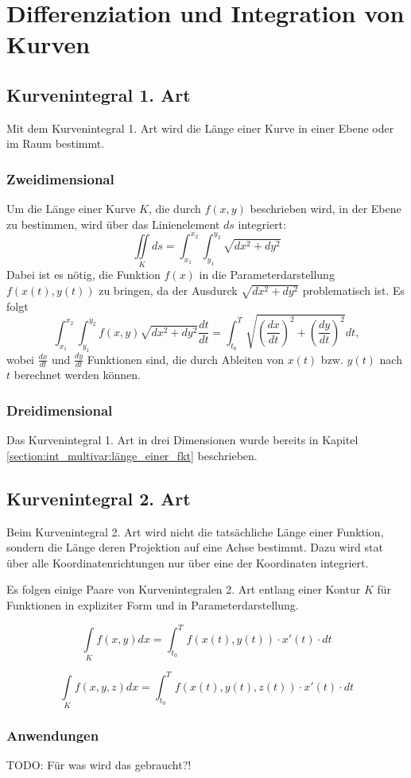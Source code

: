 \section{Differenziation und Integration von Kurven}
\subsection{Kurvenintegral 1. Art}
Mit dem Kurvenintegral 1. Art wird die Länge einer Kurve in einer Ebene oder im Raum bestimmt.

\subsubsection{Zweidimensional}
Um die Länge einer Kurve $K$, die durch $f(x, y)$ beschrieben wird, in der Ebene zu bestimmen, wird über das Linienelement $ds$ integriert:
\[
    \iint\limits_{K} ds = \int_{x_1}^{x_2} \int_{y_1}^{y_2} \sqrt{dx^2 + dy^2}
\]
Dabei ist es nötig, die Funktion $f(x)$ in die Parameterdarstellung $f(x(t), y(t))$ zu bringen, da der Ausdurck $\sqrt{dx^2 + dy^2}$ problematisch ist.
Es folgt
\[
    \int_{x_1}^{x_2} \int_{y_1}^{y_2} f(x, y) \sqrt{dx^2 + dy^2} \frac{dt}{dt} = \int_{t_0}^{T} \sqrt{(\frac{dx}{dt})^2 + (\frac{dy}{dt})^2} dt,
\]
wobei $\frac{dx}{dt}$ und $\frac{dy}{dt}$ Funktionen sind, die durch Ableiten von $x(t)$ bzw. $y(t)$ nach $t$ berechnet werden können.

\subsubsection{Dreidimensional}
Das Kurvenintegral 1. Art in drei Dimensionen wurde bereits in Kapitel \ref{section:int_multivar:länge_einer_fkt} beschrieben.

\subsection{Kurvenintegral 2. Art}
Beim Kurvenintegral 2. Art wird nicht die tatsächliche Länge einer Funktion, sondern die Länge deren Projektion auf eine Achse bestimmt.
Dazu wird stat über alle Koordinatenrichtungen nur über eine der Koordinaten integriert.

Es folgen einige Paare von Kurvenintegralen 2. Art entlang einer Kontur $K$ für Funktionen in expliziter Form und in Parameterdarstellung.

\[
    \int\limits_{K}f(x, y)dx = \int_{t_0}^{T}f(x(t), y(t)) \cdot x\prime(t) \cdot dt
\]

\[
    \int\limits_{K}f(x, y, z)dx = \int_{t_0}^{T}f(x(t), y(t), z(t)) \cdot x\prime(t) \cdot dt
\]

\subsubsection{Anwendungen}
TODO: Für was wird das gebraucht?!
